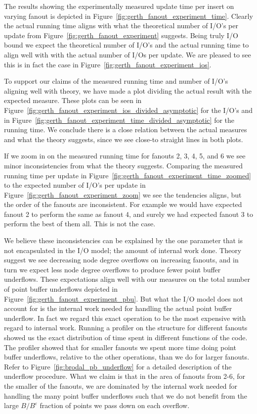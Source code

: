 \documentclass[twoside,11pt,openright]{report}
\def \epsilon {\varepsilon}
\begin{document}
The results showing the experimentally measured update time per insert on varying fanout is depicted in Figure~\ref{fig:gerth_fanout_experiment_time}. Clearly the actual running time aligns with what the theoretical number of I/O's per update from Figure~\ref{fig:gerth_fanout_experiment} suggests. Being truly I/O bound we expect the theoretical number of I/O's and the actual running time to align well with with the actual number of I/Os per update. We are pleased to see this is in fact the case in Figure~\ref{fig:gerth_fanout_experiment_ios}.

To support our claims of the measured running time and number of I/O's aligning well with theory, we have made a plot dividing the actual result with the expected measure. These plots can be seen in Figure~\ref{fig:gerth_fanout_experiment_ios_divided_asymptotic} for the I/O's and in Figure~\ref{fig:gerth_fanout_experiment_time_divided_asymptotic} for the running time. We conclude there is a close relation between the actual measures and what the theory suggests, since we see close-to straight lines in both plots.

If we zoom in on the measured running time for fanouts 2, 3, 4, 5, and 6 we see minor inconsistencies from what the theory suggests. Comparing the measured running time per update in Figure~\ref{fig:gerth_fanout_experiment_time_zoomed} to the expected number of I/O's per update in Figure~\ref{fig:gerth_fanout_experiment_zoom} we see the tendencies aligns, but the order of the fanouts are inconsistent. For example we would have expected fanout 2 to perform the same as fanout 4, and surely we had expected fanout 3 to perform the best of them all. This is not the case.

We believe these inconsistencies can be explained by the one parameter that is not encapsulated in the I/O model; the amount of internal work done. Theory suggest we see decreasing node degree overflows on increasing fanouts, and in turn we expect less node degree overflows to produce fewer point buffer underflows. These expectations align well with our measures on the total number of point buffer underflows depicted in Figure~\ref{fig:gerth_fanout_experiment_pbu}. But what the I/O model does not account for is the internal work needed for handling the actual point buffer underflow. In fact we regard this exact operation to be the most expensive with regard to internal work. 
Running a profiler on the structure for different fanouts showed us the exact distribution of time spent in different functions of the code. The profiler showed that for smaller fanouts we spent more time doing point buffer underflows, relative to the other operations, than we do for larger fanouts. Refer to Figure~\ref{fig:brodal_pb_underflow} for a detailed description of the underflow procedure. What we claim is that in the area of fanouts from 2-6, for the smaller of the fanouts, we are dominated by the internal work needed for handling the many point buffer underflows such that we do not benefit from the large $B / B^\epsilon$ fraction of points we pass down on each overflow.
\end{document}
